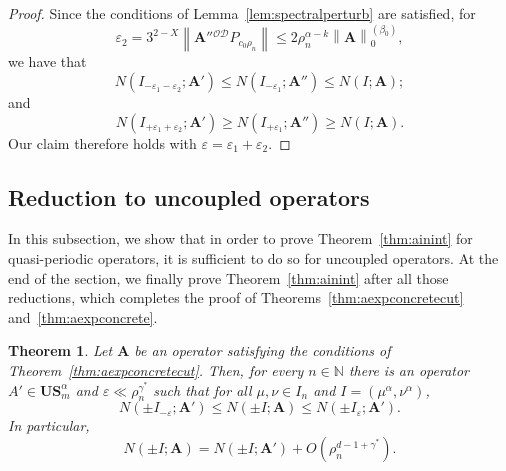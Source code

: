 \documentclass[10pt]{amsart}
\newtheorem{theo}{Theorem}[section]
\theoremstyle{definition}\newtheorem{defi}[theo]{Definition}\newtheorem{rema}[theo]{Remark}\newtheorem{exam}[theo]{Example}\newtheorem{nota}[theo]{Notation}
\newcommand{\N}{\mathbb N}
\newcommand{\CD}{\mathcal{D}}
\newcommand{\CO}{\mathcal{O}}
\newcommand{\BA}{\mathbf A}
\newcommand{\BS}{\mathbf S}
\newcommand{\BU}{\mathbf U}
\newcommand{\eps}{\varepsilon}
\newcommand{\bigo}[1]{O\left(#1 \right)}
\newcommand{\norm}[1]{\left\| #1 \right\|}
\newcommand{\snorm}[3]{\left\| #1\right\|_{#3}^{(#2)}}
\begin{document}
\begin{proof}
Since the conditions of Lemma~\ref{lem:spectralperturb} are satisfied, for
\begin{equation}
\eps_2 = 3^{2 - X} \norm{\BA''{}^{\CO\CD}P_{c_0\rho_n}} \le 2\rho_n^{\alpha - k} \snorm{\BA}{\beta_0}{0},
\end{equation}
we have that
\begin{equation}
N\left(I_{- \eps_1 - \eps_2}; \BA' \right) \le N(I_{-\eps_1};\BA'') \le N(I;\BA);
\end{equation}
and
\begin{equation}
N(I_{+ \eps_1 + \eps_2};\BA') \ge N(I_{+\eps_1};\BA'') \ge N(I;\BA).
\end{equation}
Our claim therefore holds with $\eps = \eps_1 + \eps_2$.
\end{proof}



\subsection{Reduction to uncoupled operators} \label{sec:redtouncoupled}
In this subsection, we show that in order to prove Theorem~\ref{thm:ainint} for quasi-periodic operators, it is sufficient to do so for uncoupled operators. At the end of the section, we finally prove Theorem~\ref{thm:ainint} after all those reductions, which completes the proof of Theorems~\ref{thm:aexpconcretecut} and~\ref{thm:aexpconcrete}.

\begin{theo}\label{thm:ctoucut}
Let $\BA$ be an operator satisfying the conditions of Theorem~\ref{thm:aexpconcretecut}. Then, for every $n \in \N$ there is an operator $A' \in \BU\BS^\alpha_m$ and $\eps \ll
\rho_n^{\gamma^*}$ such that for all $\mu,\nu \in I_n$ and $I = (\mu^\alpha,
\nu^\alpha)$,
\begin{equation}\label{eq:errorestinterval}
N(\pm I_{- \eps}; \BA') \le N(\pm I;\BA) \le N(\pm I_\eps;\BA').
\end{equation}
In particular,
\begin{equation}\label{eq:errorest}
N(\pm I;\BA) = N(\pm I;\BA') + \bigo{\rho_n^{d - 1 + \gamma^*}}.
\end{equation}
\end{theo}
\end{document}
